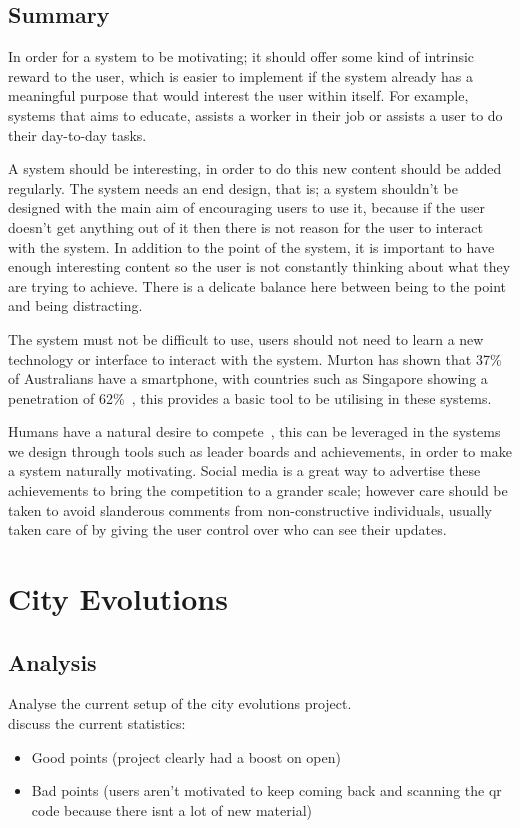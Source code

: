 \documentclass[a4paper,12pt]{article}
\begin{document}
\subsection{Summary}
In order for a system to be motivating; it should offer some kind of intrinsic reward to the user, which is easier to implement if the system already has a meaningful purpose that would interest the user within itself. For example, systems that aims to educate, assists a worker in their job or assists a user to do their day-to-day tasks.

\par
A system should be interesting, in order to do this new content should be added regularly. 
The system needs an end design, that is; a system shouldn't be designed with the main aim of encouraging users to use it, because if the user doesn't get anything out of it then there is not reason for the user to interact with the system. 
In addition to the point of the system, it is important to have enough interesting content so the user is not constantly thinking about what they are trying to achieve. There is a delicate balance here between being to the point and being distracting.

\par
The system must not be difficult to use, users should not need to learn a new technology or interface to interact with the system. Murton has shown that 37\% of Australians have a smartphone, with countries such as Singapore showing a penetration of 62\%~\citep{smartphone-use-in-au}, this provides a basic tool to be utilising in these systems.

\par
Humans have a natural desire to compete~\citep{bread-and-games}, this can be leveraged in the systems we design through tools such as leader boards and achievements, in order to make a system naturally motivating.
Social media is a great way to advertise these achievements to bring the competition to a grander scale; however care should be taken to avoid slanderous comments from non-constructive individuals, usually taken care of by giving the user control over who can see their updates.

\newpage
\section{City Evolutions}
\subsection{Analysis}
Analyse the current setup of the city evolutions project.\\
discuss the current statistics:
\begin{itemize}
	\item{Good points (project clearly had a boost on open)}
	\item{Bad points (users aren't motivated to keep coming back and scanning the qr code because there isnt a lot of new material)}
\end{itemize}
\end{document}
